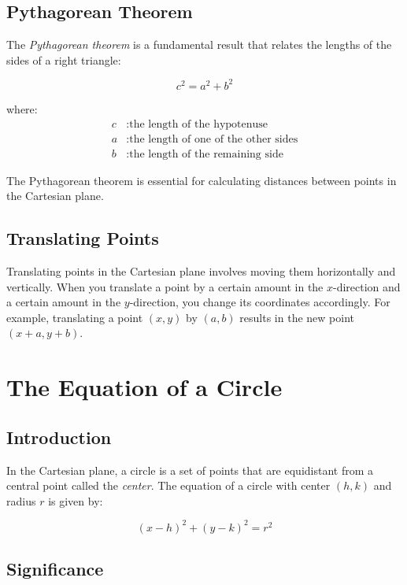 \documentclass{article}
\begin{document}
\subsection{Pythagorean Theorem}

The \emph{Pythagorean theorem} is a fundamental result that relates the lengths of the sides of a right triangle:

\[
c^2 = a^2 + b^2
\]

where:
\begin{align*}
    c & : \text{the length of the hypotenuse} \\
    a & : \text{the length of one of the other sides} \\
    b & : \text{the length of the remaining side}
\end{align*}

The Pythagorean theorem is essential for calculating distances between points in the Cartesian plane.

\subsection{Translating Points}

Translating points in the Cartesian plane involves moving them horizontally and vertically. When you translate a point by a certain amount in the $x$-direction and a certain amount in the $y$-direction, you change its coordinates accordingly. For example, translating a point $(x, y)$ by $(a, b)$ results in the new point $(x + a, y + b)$.

\section{The Equation of a Circle}

\subsection{Introduction}

In the Cartesian plane, a circle is a set of points that are equidistant from a central point called the \emph{center}. The equation of a circle with center $(h, k)$ and radius $r$ is given by:

\[
(x - h)^2 + (y - k)^2 = r^2
\]

\subsection{Significance}
\end{document}
